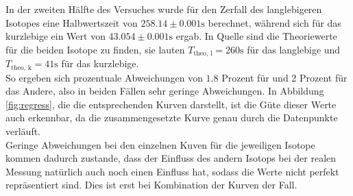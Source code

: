 In der zweiten Hälfte des Versuches wurde für den Zerfall des langlebigeren Isotopes %
eine Halbwertszeit von $258.14 \pm 0.001 \si{\s}$ berechnet, während sich für das kurzlebige ein Wert von $43.054 \pm 0.001 \si{\s}$ ergab. In Quelle %
sind die Theoriewerte für die beiden Isotope zu finden, sie lauten $T_{\text{theo, l}} = 260 \si{\s}$ für das langlebige und $T_{\text{theo, k}} = 41 \si{\s}$ für
das kurzlebige. \\
So ergeben sich prozentuale Abweichungen von $1.8$ Prozent für %
und 2 Prozent für das Andere, also in beiden Fällen sehr geringe Abweichungen. In Abbildung \ref{fig:regress}, die die entsprechenden Kurven darstellt, ist die Güte dieser 
Werte auch erkennbar, da die zusammengesetzte Kurve genau durch die Datenpunkte verläuft. \\
Geringe Abweichungen bei den einzelnen Kuven für die jeweiligen Isotope kommen dadurch zustande, dass der Einfluss des andern Isotops bei der realen Messung natürlich auch noch
einen Einfluss hat, sodass die Werte nicht perfekt repräsentiert sind. Dies ist erst bei Kombination der Kurven der Fall. 